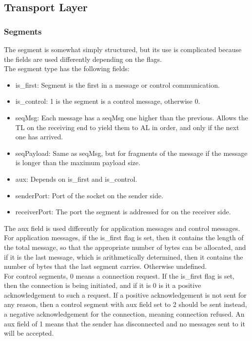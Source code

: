 \subsection{Transport Layer}
\subsubsection{Segments}
The segment is somewhat simply structured, but its use is complicated because the fields are used differently depending on the flags.\\
The segment type has the following fields:
\begin{itemize}
\item is\_first: Segment is the first in a message or control communication.
\item is\_control: 1 is the segment is a control message, otherwise 0.
\item seqMsg: Each message has a seqMsg one higher than the previous. Allows the TL on the receiving end to yield them to AL in order, and only if the next one has arrived.
\item seqPayload: Same as seqMsg, but for fragments of the message if the message is longer than the maximum payload size.
\item aux: Depends on is\_first and is\_control.
\item senderPort: Port of the socket on the sender side.
\item receiverPort: The port the segment is addressed for on the receiver side.
\end{itemize}

The aux field is used differently for application messages and control messages. For application messages, if the is\_first flag is set, then it contains the length of the total message, so that the appropriate number of bytes can be allocated, and if it is the last message, which is arithmetically determined, then it contains the number of bytes that the last segment carries. Otherwise undefined.\\
For control segments, 0 means a connection request. If the is\_first flag is set, then the connection is being initiated, and if it is 0 is it a positive acknowledgement to such a request. If a positive acknowledgement is not sent for any reason, then a control segment with aux field set to 2 should be sent instead, a negative acknowledgement for the connection, meaning connection refused. An aux field of 1 means that the sender has disconnected and no messages sent to it will be accepted.

